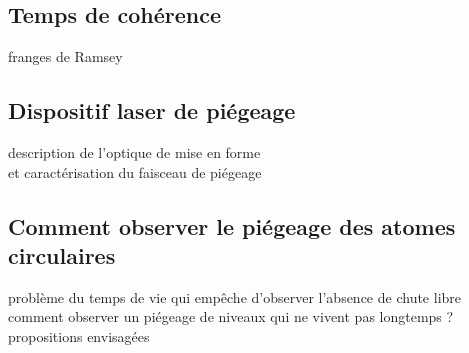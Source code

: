 	\subsection{Temps de cohérence}
		\noindent franges de Ramsey

	\subsection{Dispositif laser de piégeage}
		\noindent description de l'optique de mise en forme \\
		et caractérisation du faisceau de piégeage
	\subsection{Comment observer le piégeage des atomes circulaires}
		\noindent problème du temps de vie qui empêche d'observer l'absence de chute libre \\
		\noindent comment observer un piégeage de niveaux qui ne vivent pas longtemps ? propositions envisagées
